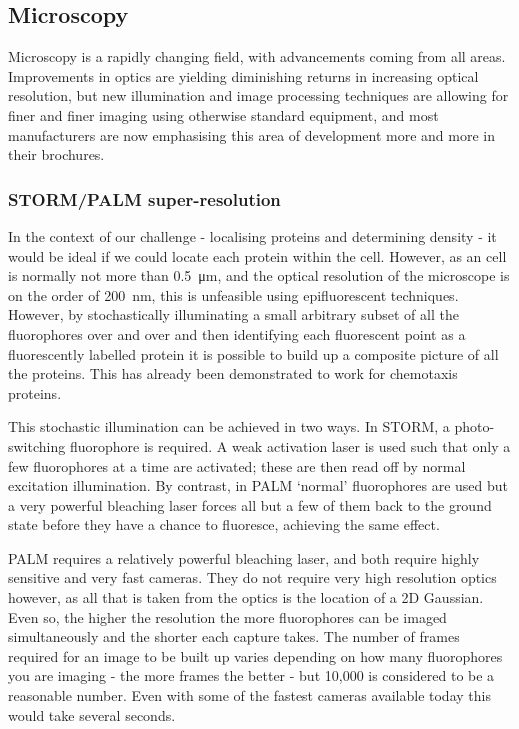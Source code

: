 \documentclass[../main.tex]{subfiles}
\begin{document}
\subsection{Microscopy}

Microscopy is a rapidly changing field, with advancements coming from all areas. Improvements in optics are yielding diminishing returns in increasing optical resolution, but new illumination and image processing techniques are allowing for finer and finer imaging using otherwise standard equipment, and most manufacturers are now emphasising this area of development more and more in their brochures.

\subsubsection{STORM/PALM super-resolution}
In the context of our challenge - localising proteins and determining density - it would be ideal if we could locate each protein within the \ecoli cell. However, as an \ecoli cell is normally not more than \SI{0.5}{\micro\meter}, and the optical resolution of the microscope is on the order of \SI{200}{\nano\meter}, this is unfeasible using epifluorescent techniques. However, by stochastically illuminating a small arbitrary subset of all the fluorophores over and over and then identifying each fluorescent point as a fluorescently labelled protein it is possible to build up a composite picture of all the proteins. This has already been demonstrated to work for \ecoli chemotaxis proteins.

This stochastic illumination can be achieved in two ways. In STORM, a photo-switching fluorophore is required. A weak activation laser is used such that only a few fluorophores at a time are activated; these are then read off by normal excitation illumination. By contrast, in PALM `normal' fluorophores are used but a very powerful bleaching laser forces all but a few of them back to the ground state before they have a chance to fluoresce, achieving the same effect.

PALM requires a relatively powerful bleaching laser, and both require highly sensitive and very fast cameras. They do not require very high resolution optics however, as all that is taken from the optics is the location of a 2D Gaussian. Even so, the higher the resolution the more fluorophores can be imaged simultaneously and the shorter each capture takes. The number of frames required for an image to be built up varies depending on how many fluorophores you are imaging - the more frames the better - but 10,000 is considered to be a reasonable number. Even with some of the fastest cameras available today this would take several seconds.
\end{document}
